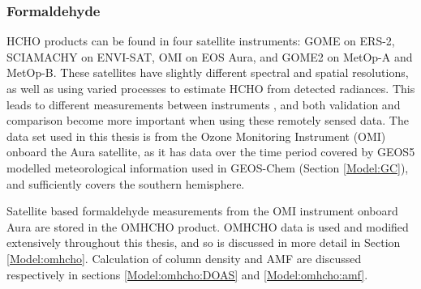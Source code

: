     
    
    
    
    \subsubsection{Formaldehyde}
      
      HCHO products can be found in four satellite instruments: GOME on ERS-2, SCIAMACHY on ENVI-SAT, OMI on EOS Aura, and GOME2 on MetOp-A and MetOp-B.
      These satellites have slightly different spectral and spatial resolutions, as well as using varied processes to estimate HCHO from detected radiances.
      This leads to different measurements between instruments \parencite{Lorente2017}, and both validation and comparison become more important when using these remotely sensed data.
      The data set used in this thesis is from the Ozone Monitoring Instrument (OMI) onboard the Aura satellite, as it has data over the time period covered by GEOS5 modelled meteorological information used in GEOS-Chem (Section \ref{Model:GC}), and sufficiently covers the southern hemisphere.
      
      Satellite based formaldehyde measurements from the OMI instrument onboard Aura are stored in the OMHCHO product.
      OMHCHO data is used and modified extensively throughout this thesis, and so is discussed in more detail in Section \ref{Model:omhcho}.
      Calculation of column density and AMF are discussed respectively in sections \ref{Model:omhcho:DOAS} and \ref{Model:omhcho:amf}.
      
      
